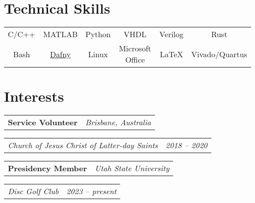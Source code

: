 \documentclass[letterpaper,12pt]{article}
\makeatletter
\def\fakesc#1{%
  \begingroup%
  \xdef\fake@name{\csname\curr@fontshape/\f@size\endcsname}%
  \fontsize{\fontdimen8\fake@name}{\baselineskip}\selectfont%
  \uppercase{#1}%
  \endgroup%
}
\newcommand{\simpleHeading}[2]{
    \vspace{-1pt}
    \begin{tabular*}{0.99\textwidth}[t]{l@{\extracolsep{\fill}}r}
        #1 & #2 \\
    \end{tabular*}
}
\newcommand{\positionHeading}[4]{
    \simpleHeading{\textbf{#1}}{\textit{#2}}
    \simpleHeading{\textit{#3}}{\textit{#4}}
}
\newcommand{\simpleParagraph}[1]{
    \vspace{-1pt}
    \begin{adjustwidth}{7pt}{0pt}
        #1
    \end{adjustwidth}
}
\newcommand{\matlab}[0]{
    MATLAB
}
\makeatother
\begin{document}


    



\section{Technical Skills}
  \begin{adjustwidth}{0.15in}{0.0in}
    \begin{tabular*}{0.97\linewidth}{@{\extracolsep{\fill}} cccccc }
        C/C++
            & \matlab
            & Python & VHDL & Verilog & Rust
            \vspace{5pt} \\
       
        Bash
            & \href{https://dafny.org/}{Dafny}
            & Linux & Microsoft Office & \LaTeX & Vivado/Quartus
    \end{tabular*}
  \end{adjustwidth}


\section{Interests}
    \positionHeading{Service Volunteer}{Brisbane, Australia}
        {Church of Jesus Christ of Latter-day Saints}{2018 -- 2020}

    \positionHeading{Presidency Member}{Utah State University}
        {Disc Golf Club}{2023 -- present}




\end{document}
